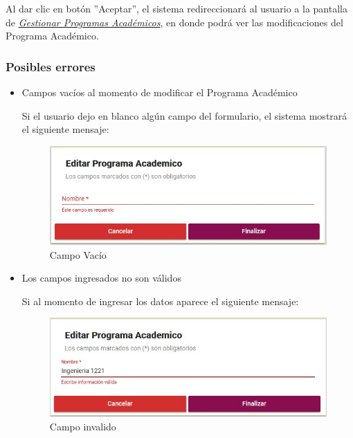         Al dar clic en botón ''Aceptar'', el sistema redireccionará al usuario a la pantalla de \hyperlink{consultarpa}{\textit{Gestionar Programas Académicos}}, en donde podrá ver las modificaciones del Programa Académico.\\

        \subsubsection{Posibles errores}

            \begin{itemize}
            	\item Campos vacíos al momento de modificar el Programa Académico

                	Si el usuario dejo en blanco algún campo del formulario, el sistema mostrará el siguiente mensaje:

                    \begin{figure}[H]
                    \centering
                    \hypertarget{vacio}{\includegraphics[width=0.7\linewidth]{images/SP3/Vacio}}
                    \caption{Campo Vacío}
                    \label{vacio}
                    \end{figure}

            	\item Los campos ingresados no son válidos

                	Si al momento de ingresar los datos aparece el siguiente mensaje:

                     \begin{figure}[H]
                    \centering
                    \hypertarget{invalido}{\includegraphics[width=0.7\linewidth]{images/SP3/Invalida}}
                    \caption{Campo invalido}
                    \label{invalido}
                    \end{figure}



\end{itemize}
